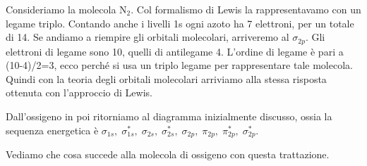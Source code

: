 Consideriamo la molecola N$_2$. Col formalismo di Lewis la rappresentavamo con un legame triplo. Contando anche i livelli 1s ogni azoto ha 7 elettroni, per un totale di 14. Se andiamo a riempire gli orbitali molecolari, arriveremo al $\sigma_{2p}$. Gli elettroni di legame sono 10, quelli di antilegame 4. L'ordine di legame è pari a (10-4)/2=3, ecco perché si usa un triplo legame per rappresentare tale molecola. Quindi con la teoria degli orbitali molecolari arriviamo alla stessa risposta ottenuta con l'approccio di Lewis.

\vspace{0.2cm}
Dall'ossigeno in poi ritorniamo al diagramma inizialmente discusso, ossia la sequenza energetica è $\sigma_{1s}, \; \sigma^*_{1s}, \; \sigma_{2s}, \; \sigma^*_{2s}, \; \sigma_{2p}, \; \pi_{2p}, \; \pi^*_{2p}, \; \sigma^*_{2p}$.

Vediamo che cosa succede alla molecola di ossigeno con questa trattazione.

